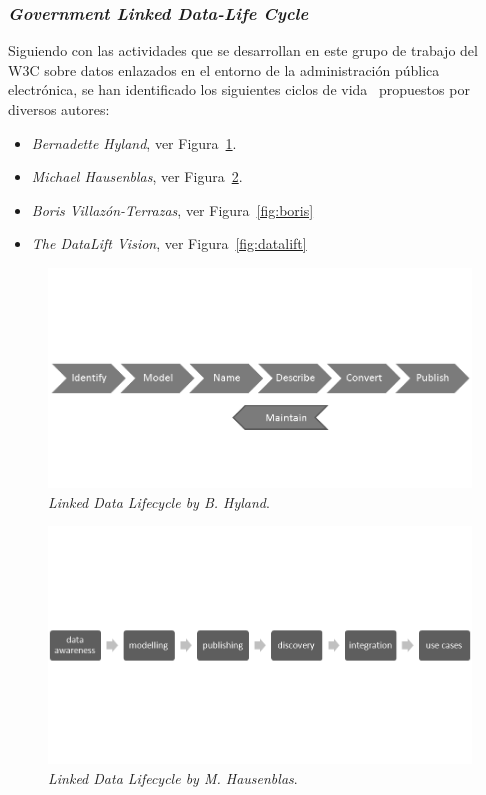 \subsubsection{\textit{Government Linked Data-Life Cycle}}\label{gld}
Siguiendo con las actividades que se desarrollan en este grupo de trabajo del W3C sobre datos enlazados
en el entorno de la administración pública electrónica, se han identificado los siguientes ciclos de vida~\cite{gld-lifecycle} propuestos
por diversos autores:

\begin{itemize}
 \item \textit{Bernadette Hyland}, ver Figura~\ref{fig:hyland}. 
 \item \textit{Michael Hausenblas}, ver Figura~\ref{fig:hausenblas}.
 \item \textit{Boris Villazón-Terrazas}, ver Figura~\ref{fig:boris}
 \item \textit{The DataLift Vision}, ver Figura~\ref{fig:datalift} 
 \end{itemize}


\begin{figure}[!htb]
\centering
	\includegraphics[width=14cm]{images/phd/Hyland}
\caption{\textit{Linked Data Lifecycle by B. Hyland}.}
\label{fig:hyland}
\end{figure}

\begin{figure}[!htb]
\centering
	\includegraphics[width=14cm]{images/phd/Hausenblas}
\caption{\textit{Linked Data Lifecycle by M. Hausenblas}.}
\label{fig:hausenblas}
\end{figure}

